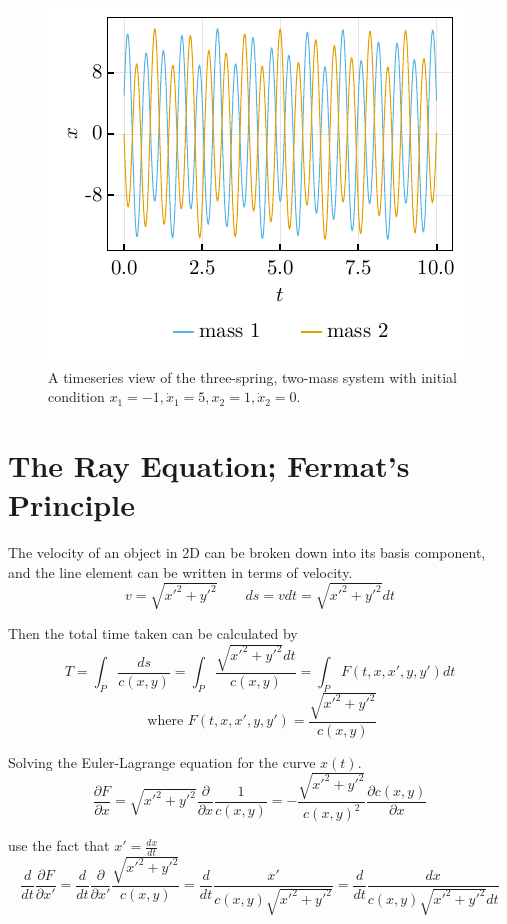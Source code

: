 \documentclass[%
 amsmath,amssymb,
aps,
 fleqn,
 notitlepage,
]{revtex4-2}
\begin{document}
\begin{figure}[ht!]
    \centering
    \includegraphics{3spring2mass_with_velocity.pdf}
    \caption{A timeseries view of the three-spring, two-mass system with initial condition $x_1=-1,\dot{x}_1=5, x_2=1,\dot{x}_2=0$.}
    \label{fig: tstm_with_vel}
\end{figure}



\section{The Ray Equation; Fermat's Principle} %

The velocity of an object in 2D can be broken down into its basis component, and the line element can be written in terms of velocity.
\[v = \sqrt{x'^2+y'^2}\qquad ds = vdt = \sqrt{x'^2+y'^2}dt\]

Then the total time taken can be calculated by
\[T = \int_P \frac{ds}{c(x,y)} = \int_P \frac{\sqrt{x'^2+y'^2}dt}{c(x,y)} = \int_PF(t,x,x',y,y')dt\]
\[\text{ where }F(t,x,x',y,y') = \frac{\sqrt{x'^2+y'^2}}{c(x,y)}\]

Solving the Euler-Lagrange equation for the curve $x(t)$.
\[\frac{\partial F}{\partial x} = \sqrt{x'^2+y'^2}\frac{\partial}{\partial x}\frac{1}{c(x,y)} = -\frac{\sqrt{x'^2+y'^2}}{c(x,y)^2}\frac{\partial c(x,y)}{\partial x}\]

use the fact that $x' = \frac{dx}{dt}$
\[\frac{d}{d t} \frac{\partial F}{\partial x'} = \frac{d}{dt} \frac{\partial}{\partial x'}\frac{\sqrt{x'^2+y'^2}}{c(x,y)} = \frac{d}{dt} \frac{x'}{c(x,y)\sqrt{x'^2+y'^2}} = \frac{d}{dt} \frac{dx}{c(x,y)\sqrt{x'^2+y'^2}dt}\]
\end{document}
